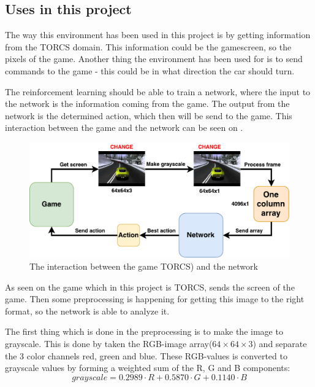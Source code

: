\subsection{Uses in this project}      
The way this environment has been used in this project is by getting information from the TORCS domain. This information could be the gamescreen, so the pixels of the game. Another thing the environment has been used for is to send commands to the game - this could be in what direction the car should turn.

The reinforcement learning should be able to train a network, where the input to the network is the information coming from the game. The output from the network is the determined action, which then will be send to the game. This interaction between the game and the network can be seen on .    
 
\begin{figure}[H]
	\centering
	\includegraphics[width=1\textwidth]{Figures/Architecture/TORCS_interaction.pdf}
	\caption{The interaction between the game TORCS) and the network }
	\label{fig:TORCS_interaction}
\end{figure}

 
As seen on  the game which in this project is TORCS, sends the screen of the game. Then some preprocessing is happening for getting this image to the right format, so the network is able to analyze it.

The first thing which is done in the preprocessing is to make the image to grayscale. This is done by taken the RGB-image array($64 \times 64 \times 3$) and separate the 3 color channels red, green and blue. These RGB-values is converted to grayscale values by forming a weighted sum of the R, G and B components:
\begin{equation}
grayscale = 0.2989 \cdot R + 0.5870 \cdot G + 0.1140 \cdot B 
\end{equation}  

   
